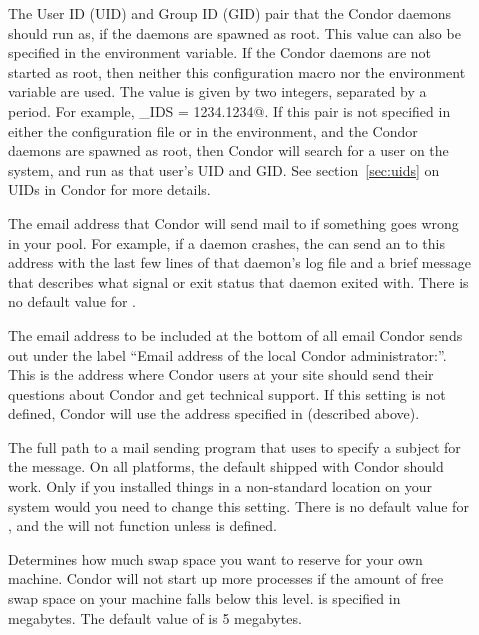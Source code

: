 \begin{description}
\item[] \label{param:CondorIds}
  The User ID (UID) and Group ID (GID) pair that the Condor daemons
  should run as, if the daemons are spawned as root.
  This value can also be specified in the 
  environment variable.
  If the Condor daemons are not started as root, then neither this
   configuration macro nor the 
  environment variable are used.
  The value is given by two integers, separated by a period.  For
  example, \verb@CONDOR_IDS = 1234.1234@.
  If this pair is not specified in either the configuration file or in the
  environment, and the Condor daemons are spawned as root,
  then Condor will
  search for a \verb@condor@ user on the system, and run as that user's
  UID and GID.
  See section~\ref{sec:uids} on UIDs in Condor for more details.

\item[] \label{param:CondorAdmin} The email
  address that Condor will send mail to if something goes wrong in
  your pool.  For example, if a daemon crashes, the 
  can send an  to this address with the last few lines
  of that daemon's log file and a brief message that describes what
  signal or exit status that daemon exited with.  There is no default
  value for .
  
\item[] \label{param:CondorSupportEmail}
  The email address to be included at the bottom of all email Condor
  sends out under the label ``Email address of the local Condor
  administrator:''.  
  This is the address where Condor users at your site should send
  their questions about Condor and get technical support.
  If this setting is not defined, Condor will use the address
  specified in  (described above).

\item[] \label{param:Mail} The full path to a mail
  sending program that uses  to specify a subject for the
  message.  On all platforms, the default shipped with Condor should
  work.  Only if you installed things in a non-standard location on
  your system would you need to change this setting.  There is no
  default value for , and the  will not
  function unless  is defined.

\item[] \label{param:ReservedSwap} Determines
  how much swap space you want to reserve for your own machine.
  Condor will not start up more  processes if the
  amount of free swap space on your machine falls below this level.
   is specified in megabytes.  The default value
  of  is 5 megabytes.


\end{description}
